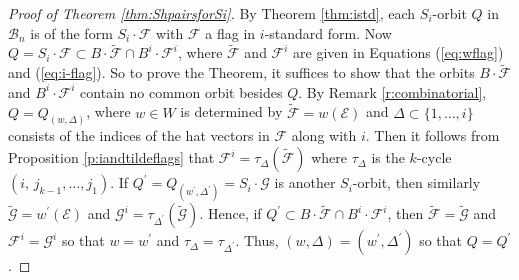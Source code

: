 \documentclass[12pt]{amsart}
\numberwithin{equation}{section}
\theoremstyle{remark}
\theoremstyle{definition}
\newcommand{\B}{\mathcal{B}}
\newcommand{\he}{\hat{e}}
\newcommand{\F}{\mathcal{F}}
\begin{document}
\begin{proof}[Proof of Theorem \ref{thm:ShpairsforSi}]
By Theorem \ref{thm:istd}, each $S_i$-orbit $Q$ in $\B_{n}$ is of the form $S_{i}\cdot\F$ with $\F$ a flag in 
$i$-standard form.  Now 
$Q=S_{i}\cdot \F\subset B\cdot\tilde{\F}\cap B^{i}\cdot \F^{i}$, where 
$\tilde{\F}$ and $\F^{i}$ are given in Equations (\ref{eq:wflag}) and (\ref{eq:i-flag}). So to prove the 
Theorem, it suffices to show that the orbits $B\cdot \tilde{\F}$ and $B^{i}\cdot \F^{i}$ contain no common orbit besides $Q$.   By Remark \ref{r:combinatorial}, $Q=Q_{(w,\Delta)}$, where $w\in W$ is determined by $\tilde{\F}=w(\mathcal{E})$ and $\Delta\subset \{1,\dots, i\}$ consists of the indices of the hat vectors in $\F$ along with $i$.  Then it follows from Proposition \ref{p:iandtildeflags} that $\F^{i}=\tau_{\Delta}(\tilde{\F})$ where $\tau_{\Delta}$ is the $k$-cycle $(i,\, j_{k-1},\dots, j_{1}).$  If $Q^{\prime}=Q_{(w^{\prime}, \Delta^{\prime})}=S_{i}\cdot\mathcal{G}$ is another $S_{i}$-orbit, then similarly $\tilde{\mathcal{G}}=w^{\prime}(\mathcal{E})$ and
$\mathcal{G}^{i}=\tau_{\Delta^{\prime}}(\tilde{\mathcal{G}}).$   Hence, if $Q^{\prime}\subset  B\cdot\tilde{\F}\cap B^{i}\cdot \F^{i}$, then $\tilde{\F}=\tilde{\mathcal{G}}$ and $\F^{i}=\mathcal{G}^{i}$ so that $w=w^{\prime}$ and $\tau_{\Delta}=\tau_{\Delta^{\prime}}$.  Thus, $(w,\Delta)=(w^{\prime}, \Delta^{\prime})$ so that $Q=Q^{\prime}$.  


\end{proof}

\end{document}
